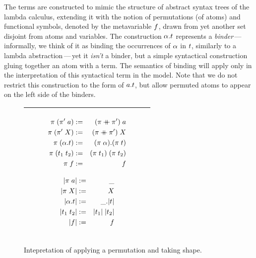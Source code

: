 \documentclass[english, mgr]{iithesis}
\renewcommand{\it}[1]{\textit{#1}}
\newcommand{\mdash}{\,---\,}
\def\-{{\mdash}}
\begin{document}
The terms are constructed to mimic the structure of abstract syntax trees of the lambda calculus,
extending it with the notion of permutations (of atoms) and functional symbols,
denoted by the metavariable $f$, drawn from yet another set disjoint from atoms and variables.
The construction $\alpha. t$ represents a \it{binder}\-informally, we think of it as binding the occurrences of $\alpha$ in $t$,
similarly to a lambda abstraction\-yet it \it{isn't} a binder,
but a simple syntactical construction gluing together an atom with a term.
The semantics of binding will apply only in the interpretation of this syntactical term in the model.
Note that we do not restrict this construction to the form of $a. t$, but allow permuted atoms to appear on the left side of the binders.

\begin{figure}[htbp]
  \centering
  \begin{tabularx}{\textwidth}{|C|}
    \hline
    \begin{subfigure}{0.45\textwidth}
      \begin{eqnarray*}
        \perm \apperm (\perm' \apperm \atomv)  & := & (\perm \++ \perm') \apperm \atomv \\
        \perm \apperm (\perm' \apperm \termv)  & := & (\perm \++ \perm') \apperm \termv \\
        \perm \apperm (\tbind{\atomexp} \term) & := & \tbind{(\perm \apperm \atomexp)} (\perm \apperm \term) \\
        \perm \apperm (\term_1 \tapp \term_2)  & := & (\perm \apperm \term_1) \tapp (\perm \apperm \term_2) \\
        \perm \apperm \symb                    & := & \symb \\
      \end{eqnarray*}
    \end{subfigure}
    \begin{subfigure}{0.45\textwidth}
      \begin{eqnarray*}
        |\pi \; a|   & := & \_ \\
        |\pi \; X|   & := & X  \\
        |\alpha. t| & := & \_. |t| \\
        |t_1 \; t_2|  & := & |t_1| \; |t_2| \\
        |f|                  & := & f \\
      \end{eqnarray*}
    \end{subfigure}
  \\ \hline
  \end{tabularx}
  \caption{Intepretation of applying a permutation and taking shape.}
  \label{fig:permutation-shapes-interpretation}
\end{figure}
\end{document}
